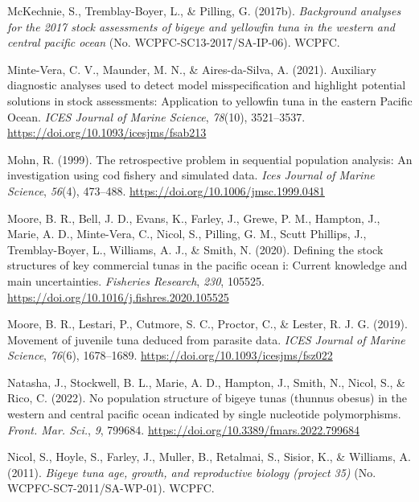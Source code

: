 \documentclass[
  english,
  a4paper,
  a4paper,
  11pt]{SCreport}
\newlength{\cslhangindent}
\newenvironment{CSLReferences}[2] %
 {\begin{list}{}{%
  \setlength{\itemindent}{0pt}
  \setlength{\leftmargin}{0pt}
  \setlength{\parsep}{0pt}
  \ifodd #1
   \setlength{\leftmargin}{\cslhangindent}
   \setlength{\itemindent}{-1\cslhangindent}
  \fi
  \setlength{\itemsep}{#2\baselineskip}}}
 {\end{list}}
\begin{document}
\begin{CSLReferences}{1}{0}
McKechnie, S., Tremblay-Boyer, L., \& Pilling, G. (2017b).
\emph{Background analyses for the 2017 stock assessments of bigeye and
yellowfin tuna in the western and central pacific ocean} (No.
{WCPFC}-{SC}13-2017/{SA}-{IP}-06). WCPFC.

Minte-Vera, C. V., Maunder, M. N., \& Aires-da-Silva, A. (2021).
Auxiliary diagnostic analyses used to detect model misspecification and
highlight potential solutions in stock assessments: Application to
yellowfin tuna in the eastern {Pacific} {Ocean}. \emph{ICES Journal of
Marine Science}, \emph{78}(10), 3521--3537.
\url{https://doi.org/10.1093/icesjms/fsab213}

Mohn, R. (1999). The retrospective problem in sequential population
analysis: An investigation using cod fishery and simulated data.
\emph{Ices Journal of Marine Science}, \emph{56}(4), 473--488.
\url{https://doi.org/10.1006/jmsc.1999.0481}

Moore, B. R., Bell, J. D., Evans, K., Farley, J., Grewe, P. M., Hampton,
J., Marie, A. D., Minte-Vera, C., Nicol, S., Pilling, G. M., Scutt
Phillips, J., Tremblay-Boyer, L., Williams, A. J., \& Smith, N. (2020).
Defining the stock structures of key commercial tunas in the pacific
ocean i: Current knowledge and main uncertainties. \emph{Fisheries
Research}, \emph{230}, 105525.
\url{https://doi.org/10.1016/j.fishres.2020.105525}

Moore, B. R., Lestari, P., Cutmore, S. C., Proctor, C., \& Lester, R. J.
G. (2019). Movement of juvenile tuna deduced from parasite data.
\emph{{ICES} Journal of Marine Science}, \emph{76}(6), 1678--1689.
\url{https://doi.org/10.1093/icesjms/fsz022}

Natasha, J., Stockwell, B. L., Marie, A. D., Hampton, J., Smith, N.,
Nicol, S., \& Rico, C. (2022). No population structure of bigeye tunas
(thunnus obesus) in the western and central pacific ocean indicated by
single nucleotide polymorphisms. \emph{Front. Mar. Sci.}, \emph{9},
799684. \url{https://doi.org/10.3389/fmars.2022.799684}

Nicol, S., Hoyle, S., Farley, J., Muller, B., Retalmai, S., Sisior, K.,
\& Williams, A. (2011). \emph{Bigeye tuna age, growth, and reproductive
biology (project 35)} (No. {WCPFC}-{SC}7-2011/{SA}-{WP}-01). WCPFC.


\end{CSLReferences}
\end{document}
